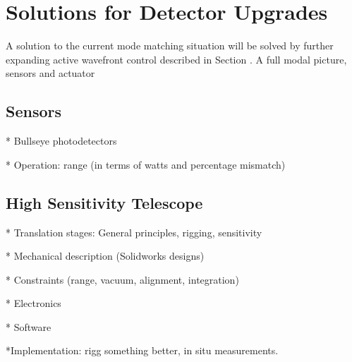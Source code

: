 \chapter{Solutions for Detector Upgrades} 
A solution to the current mode matching situation will be solved by further expanding active wavefront control described in Section \cite{AWC_current}. A full modal picture, sensors and actuator
	\section{Sensors}
* Bullseye photodetectors

* Operation: range (in terms of watts and percentage mismatch)


	\section{High Sensitivity Telescope}
	* Translation stages: General principles, rigging, sensitivity
	
	* Mechanical description (Solidworks designs)
	
	* Constraints (range, vacuum, alignment, integration)

	* Electronics 
	
	* Software
	
	*Implementation: rigg something better, in situ measurements.